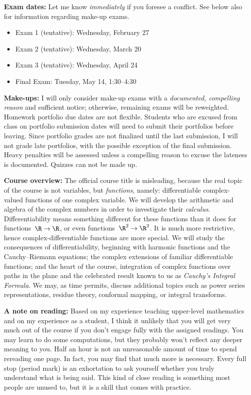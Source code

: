 \documentclass[11pt]{amsart}
\begin{document}
\textbf{Exam dates:} Let me know \emph{immediately} if you foresee a conflict. See below also for information regarding make-up exams.
\begin{itemize}
   \item Exam 1 (tentative): Wednesday, February 27
   \item Exam 2 (tentative): Wednesday, March 20
   \item Exam 3 (tentative): Wednesday, April 24
   \item Final Exam: Tuesday, May 14, 1:30--4:30
\end{itemize}
%
\textbf{Make-ups:} I will only consider make-up exams with a \emph{documented, compelling reason} and sufficient notice; otherwise, remaining exams will be reweighted. Homework portfolio due dates are not flexible. Students who are excused from class on portfolio submission dates will need to submit their portfolios before leaving. Since portfolio grades are not finalized until the last submission, I will not grade late portfolios, with the possible exception of the final submission. Heavy penalties will be assessed unless a compelling reason to excuse the lateness is documented. Quizzes can not be made up.

\textbf{Course overview:} The official course title is misleading, because the real topic of the course is not variables, but \emph{functions}, namely: differentiable complex-valued functions of one complex variable. We will develop the arithmetic and algebra of the complex numbers in order to investigate their \emph{calculus}. Differentiability means something different for these functions than it does for functions~$\R \to \R$, or even functions~$\R^2 \to \R^2$. It is much more restrictive, hence complex-differentiable functions are more special. We will study the consequences of differentiability, beginning with harmonic functions and the Cauchy--Riemann equations; the complex extensions of familiar differentiable functions; and the heart of the course, integration of complex functions over paths in the plane and the celebrated result known to us as \emph{Cauchy's Integral Formula}. We may, as time permits, discuss additional topics such as power series representations, residue theory, conformal mapping, or integral transforms.

\textbf{A note on reading:} Based on my experience teaching upper-level mathematics and on my experience as a student, I think it unlikely that you will get very much out of the course if you don't engage fully with the assigned readings. You may learn to do some computations, but they probably won't reflect any deeper meaning to you. Half an hour is not an unreasonable amount of time to spend rereading one page. In fact, you may find that much more is necessary. Every full stop (period mark) is an exhortation to ask yourself whether you truly understand what is being said. This kind of close reading is something most people are unused to, but it is a skill that comes with practice. 
\end{document}
